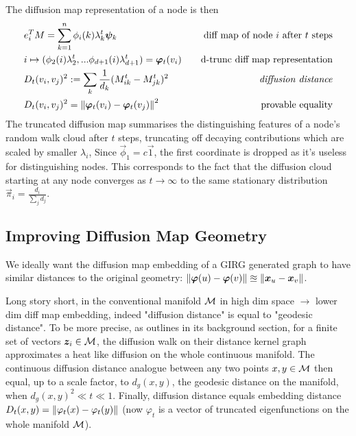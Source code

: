 The diffusion map representation of a node is then
\begin{align*}
  & e_i^T M = \sum_{k=1}^n \phi_i(k) \lambda_k^t \bm{\psi}_k \quad & \text{diff map of node $i$ after $t$ steps}\\
  & i \mapsto (\phi_2(i) \lambda_2^t,... \phi_{d+1}(i) \lambda_{d+1}^t) = \bm{\varphi}_t(v_i) \quad & \text{d-trunc diff map representation}
  \\
  & D_t(v_i, v_j)^2 := \sum_k \frac{1}{d_k} (M^t_{ik} - M^t_{jk})^2
  \quad & \text{\textit{diffusion distance}}
  \\
  & D_t(v_i, v_j)^2 = \left\lVert \bm{\varphi}_t(v_i) - \bm{\varphi}_t(v_j)\right\rVert^2
  \quad & \text{provable equality}
\end{align*}
%
The truncated diffusion map summarises the distinguishing features of a node's random walk cloud after $t$ steps, truncating off decaying contributions which are scaled by smaller $\lambda_i$,
Since $\vec{\phi}_1 = c \vec{1}$, the first coordinate is dropped as it's useless for distinguishing nodes. This corresponds to the fact that the diffusion cloud starting at any node converges as $t \to \infty$ to the same stationary distribution $\vec{\pi}_i = \frac{d_i}{\sum_j d_j}$.

\subsection{Improving Diffusion Map Geometry}
We ideally want the diffusion map embedding of a GIRG generated graph to have similar distances to the original geometry: $\left\lVert \bm{\varphi}(u) - \bm{\varphi}(v)\right\rVert \approxeq \left\lVert \bm{x}_u - \bm{x}_v\right\rVert$.

Long story short, in the conventional manifold $\mathcal{M}$ in high dim space $\to$ lower dim diff map embedding, indeed "diffusion distance" is equal to "geodesic distance". To be more precise, as \cite{berry2018iterated} outlines in its background section, for a finite set of vectors $\bm{z}_i \in \mathcal{M}$, the diffusion walk on their distance kernel graph approximates a heat like diffusion on the whole continuous manifold. The continuous diffusion distance analogue between any two points $x, y \in \mathcal{M}$ then equal, up to a scale factor, to $d_g(x,y)$, the geodesic distance on the manifold, when $d_g(x, y)^2 \ll t \ll 1$. Finally, diffusion distance equals embedding distance $D_t(x, y) = \left\lVert \varphi_t(x) - \varphi_t(y)\right\rVert$ (now $\varphi_t$ is a vector of truncated eigenfunctions on the whole manifold $\mathcal{M}$).


